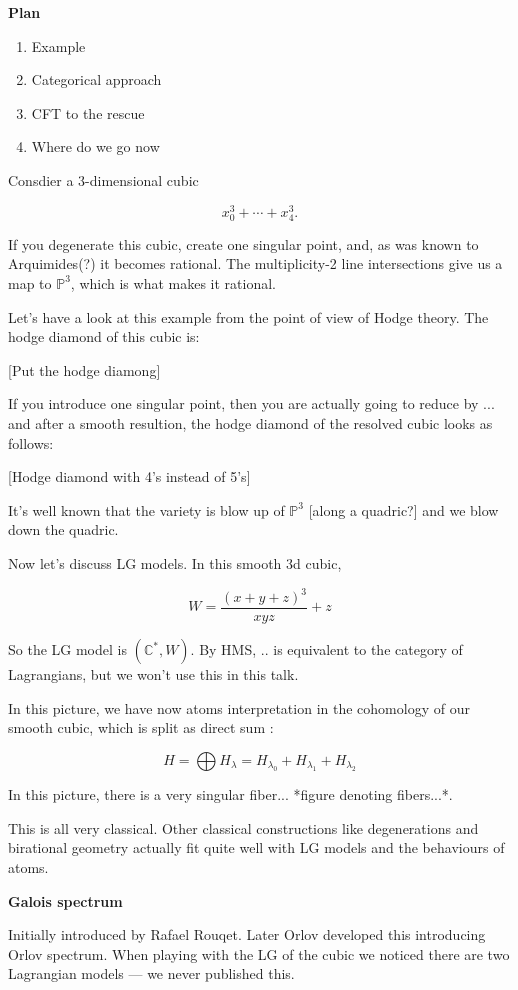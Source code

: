 \medskip\noindent
{\bf Plan}

\begin{enumerate}
\item Example
\item Categorical approach
\item CFT to the rescue
\item Where do we go now
\end{enumerate}

\medskip\noindent
Consdier a 3-dimensional cubic

$$
x_0^3+\cdots+x_4^3.
$$

If you degenerate this cubic, create
one singular point, and, as was known
to Arquimides(?) it becomes rational.
The multiplicity-2 line intersections
give us a map to
$\mathbb{P}^3$,
which is what
makes it rational.

Let's have a look at this example from
the point of view of Hodge theory. The
hodge diamond of this cubic is:

[Put the hodge diamong]

If you introduce one singular point,
then you are actually going to reduce
by ... and after a smooth resultion,
the hodge diamond of the resolved cubic
looks as follows:

[Hodge diamond with 4's instead of
5's]

It's well known that the variety is
blow up of $\mathbb{P}^3$
[along a quadric?] and we
blow down the quadric.

Now let's discuss LG models. In this
smooth 3d cubic,

$$
W=
\frac{(x+y+z)^3}{xyz}+z
$$

So the LG model is
$(\mathbb{C}^*,W)$. By
HMS, .. is equivalent to the category
of Lagrangians, but we won't use this
in this talk.

In this picture, we have now atoms
interpretation in the cohomology of
our smooth cubic, which is split as
direct sum :

$$
H=\bigoplus H_\lambda
=H_{\lambda_0}+H_{\lambda_1}
+H_{\lambda_2}
$$

In this picture, there is a very
singular fiber... *figure denoting
fibers...*.

This is all very classical. Other
classical constructions like
degenerations and birational geometry
actually fit quite well with LG models
and the behaviours of atoms.

\medskip\noindent
{\bf Galois spectrum} 

Initially introduced by Rafael Rouqet.
Later Orlov developed this introducing
Orlov spectrum. When playing with the LG
of the cubic we noticed there are two
Lagrangian models --- we never published
this.

